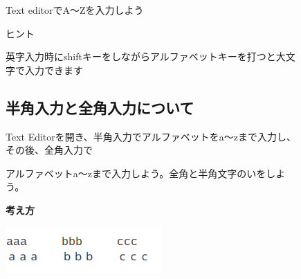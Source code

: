 \documentclass[a4paper,12pt]{jarticle}
\begin{document}
\begin{figure}[ht]
  \flushleft
  \theQuestion\label{Q:hasAnswer02-4}
  Text editorでA〜Zを入力しよう

  ヒント

  英字入力時にshiftキーをしながらアルファベットキーを打つと大文字で入力できます
\end{figure}
\clearpage
\begin{figure}[ht]
  \subsection{\theExercise 半角入力と全角入力について}
  Text
  Editorを開き、半角入力でアルファベットをa〜zまで入力し、その後、全角入力で

  アルファベットa〜zまで入力しよう。全角と半角文字のいをしよう。

  {\bf\large 考え方}

  \centering
  \includegraphics[width=5.978cm,height=1.773cm]{textbook-img066.png}

  \begin{minipage}{16.578cm}

    \bigskip


\end{minipage}
\end{figure}
\end{document}
